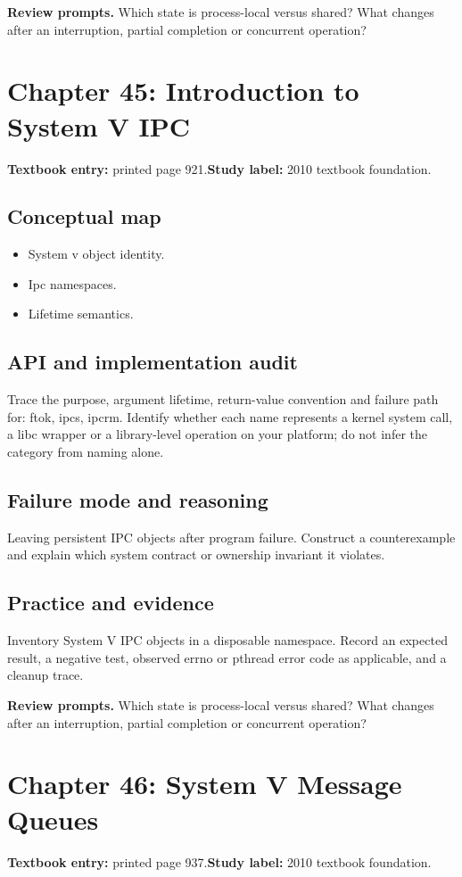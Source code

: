 \documentclass[11pt,letterpaper,oneside]{report}
\begin{document}
\textbf{Review prompts.} Which state is process-local versus shared? What changes after an interruption, partial completion or concurrent operation?

\section{Chapter 45: Introduction to System V IPC}
\textbf{Textbook entry:} printed page 921.\quad \textbf{Study label:} 2010 textbook foundation.

\subsection{Conceptual map}
\begin{itemize}
\item System v object identity.
\item Ipc namespaces.
\item Lifetime semantics.
\end{itemize}
\subsection{API and implementation audit}
Trace the purpose, argument lifetime, return-value convention and failure path for: ftok, ipcs, ipcrm. Identify whether each name represents a kernel system call, a libc wrapper or a library-level operation on your platform; do not infer the category from naming alone.

\subsection{Failure mode and reasoning}
Leaving persistent IPC objects after program failure. Construct a counterexample and explain which system contract or ownership invariant it violates.

\subsection{Practice and evidence}
Inventory System V IPC objects in a disposable namespace. Record an expected result, a negative test, observed errno or pthread error code as applicable, and a cleanup trace.

\textbf{Review prompts.} Which state is process-local versus shared? What changes after an interruption, partial completion or concurrent operation?

\section{Chapter 46: System V Message Queues}
\textbf{Textbook entry:} printed page 937.\quad \textbf{Study label:} 2010 textbook foundation.
\end{document}
